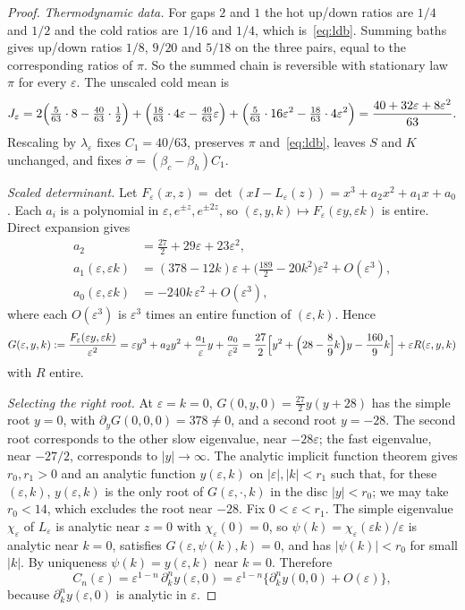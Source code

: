 \documentclass[11pt,a4paper]{article}
\theoremstyle{remark}\newtheorem{remark}[theorem]{Remark}
\newcommand{\eps}{\varepsilon}
\begin{document}
\begin{proof}
\emph{Thermodynamic data.} For gaps $2$ and $1$ the hot up/down ratios are $1/4$ and $1/2$ and the cold ratios are $1/16$ and $1/4$, which is~\eqref{eq:ldb}. Summing baths gives up/down ratios $1/8$, $9/20$ and $5/18$ on the three pairs, equal to the corresponding ratios of $\pi$. So the summed chain is reversible with stationary law $\pi$ for every $\eps$. The unscaled cold mean is
\begin{equation}
J_\eps=2\Bigl(\tfrac5{63}\cdot8-\tfrac{40}{63}\cdot\tfrac12\Bigr)+\Bigl(\tfrac{18}{63}\cdot4\eps-\tfrac{40}{63}\eps\Bigr)+\Bigl(\tfrac5{63}\cdot16\eps^2-\tfrac{18}{63}\cdot4\eps^2\Bigr)=\frac{40+32\eps+8\eps^2}{63}.
\end{equation}
Rescaling by $\lambda_\eps$ fixes $C_1=40/63$, preserves $\pi$ and~\eqref{eq:ldb}, leaves $S$ and $K$ unchanged, and fixes $\dot\sigma=(\beta_c-\beta_h)C_1$.

\emph{Scaled determinant.} Let $F_\eps(x,z)=\det(xI-L_\eps(z))=x^3+a_2x^2+a_1x+a_0$. Each $a_i$ is a polynomial in $\eps,e^{\pm z},e^{\pm2z}$, so $(\eps,y,k)\mapsto F_\eps(\eps y,\eps k)$ is entire. Direct expansion gives
\begin{align}
a_2&=\tfrac{27}{2}+29\eps+23\eps^2,\nonumber\\
a_1(\eps,\eps k)&=(378-12k)\eps+\bigl(\tfrac{189}{2}-20k^2\bigr)\eps^2+O(\eps^3),\label{eq:coeffs}\\
a_0(\eps,\eps k)&=-240k\,\eps^2+O(\eps^3),\nonumber
\end{align}
where each $O(\eps^3)$ is $\eps^3$ times an entire function of $(\eps,k)$. Hence
\begin{equation}\label{eq:scaledpoly}
G(\eps,y,k):=\frac{F_\eps(\eps y,\eps k)}{\eps^2}=\eps y^3+a_2y^2+\frac{a_1}{\eps}y+\frac{a_0}{\eps^2}
=\frac{27}{2}\Bigl[y^2+\Bigl(28-\frac89k\Bigr)y-\frac{160}{9}k\Bigr]+\eps R(\eps,y,k)
\end{equation}
with $R$ entire.

\emph{Selecting the right root.} At $\eps=k=0$, $G(0,y,0)=\frac{27}{2}y(y+28)$ has the simple root $y=0$, with $\partial_yG(0,0,0)=378\ne0$, and a second root $y=-28$. The second root corresponds to the other slow eigenvalue, near $-28\eps$; the fast eigenvalue, near $-27/2$, corresponds to $|y|\to\infty$. The analytic implicit function theorem gives $r_0,r_1>0$ and an analytic function $y(\eps,k)$ on $|\eps|,|k|<r_1$ such that, for these $(\eps,k)$, $y(\eps,k)$ is the only root of $G(\eps,\cdot,k)$ in the disc $|y|<r_0$; we may take $r_0<14$, which excludes the root near $-28$. Fix $0<\eps<r_1$. The simple eigenvalue $\chi_\eps$ of $L_\eps$ is analytic near $z=0$ with $\chi_\eps(0)=0$, so $\psi(k)=\chi_\eps(\eps k)/\eps$ is analytic near $k=0$, satisfies $G(\eps,\psi(k),k)=0$, and has $|\psi(k)|<r_0$ for small $|k|$. By uniqueness $\psi(k)=y(\eps,k)$ near $k=0$. Therefore
\begin{equation}
C_n(\eps)=\eps^{1-n}\,\partial_k^ny(\eps,0)=\eps^{1-n}\bigl\{\partial_k^ny(0,0)+O(\eps)\bigr\},
\end{equation}
because $\partial_k^ny(\eps,0)$ is analytic in $\eps$.


\end{proof}
\end{document}

